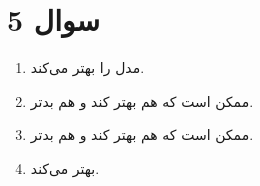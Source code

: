 \section*{سوال 5}
\begin{enumerate}
    \item مدل را بهتر می‌کند.
    \item ممکن است که هم بهتر کند و هم بدتر.
    \item ممکن است که هم بهتر کند و هم بدتر.
    \item بهتر می‌کند.
\end{enumerate}